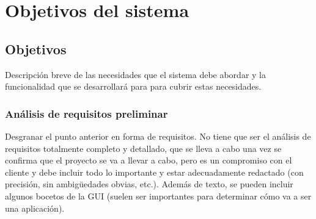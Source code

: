 
\chapter{Objetivos del sistema} %

\label{Chapter2} %


\section{Objetivos}

Descripción breve de las necesidades que el sistema debe abordar y la funcionalidad que se desarrollará para para cubrir estas necesidades.

\subsection{An\'alisis de requisitos preliminar}

Desgranar el punto anterior en forma de requisitos. No tiene que ser el análisis de requisitos totalmente completo y detallado, que se lleva a cabo una vez se confirma que el proyecto se va a llevar a cabo, pero es un compromiso con el cliente y debe incluir todo lo importante y estar adecuadamente redactado (con precisión, sin ambigüedades obvias, etc.). Además de texto, se pueden incluir algunos bocetos de la GUI (suelen ser importantes para determinar cómo va a ser una aplicación).